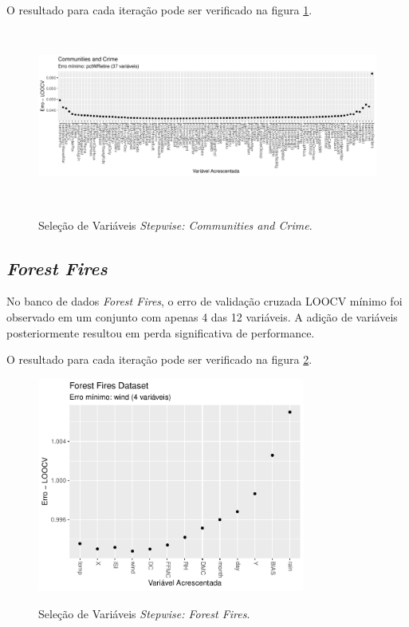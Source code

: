 O resultado para cada iteração pode ser verificado na figura \ref{fig:stepwise_CommunitiesandCrime_validation}.

\begin{figure}[!htb]
    \centering
    \caption{Seleção de Variáveis \textit{Stepwise: Communities and Crime}.}
    \includegraphics[height=163pt]{imgs/res/CommunitiesandCrime_validation.pdf}
    \label{fig:stepwise_CommunitiesandCrime_validation}
\end{figure}
\FloatBarrier

\subsection{\textit{Forest Fires}}
No banco de dados \textit{Forest Fires}, o erro de validação cruzada LOOCV mínimo foi observado em um conjunto com apenas 4 das 12 variáveis. A adição de variáveis posteriormente resultou em perda significativa de performance. 

O resultado para cada iteração pode ser verificado na figura \ref{fig:stepwise_ForestFiresDataset_validation}.

\begin{figure}[!htb]
    \centering
    \caption{Seleção de Variáveis \textit{Stepwise: Forest Fires}.}
    \includegraphics[height=200pt]{imgs/res/ForestFiresDataset_validation.pdf}
    \label{fig:stepwise_ForestFiresDataset_validation}
\end{figure}
\FloatBarrier


